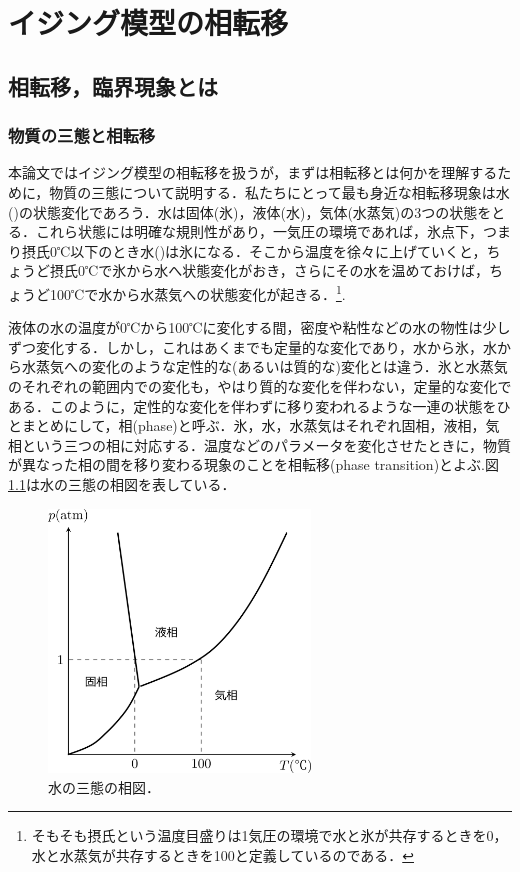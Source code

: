 \documentclass[a4paper,11pt]{jsreport}
\begin{document}
\chapter{イジング模型の相転移}
\section{相転移，臨界現象とは}
\subsection{物質の三態と相転移}
本論文ではイジング模型の相転移を扱うが，まずは相転移とは何かを理解するために，物質の三態について説明する．私たちにとって最も身近な相転移現象は水()の状態変化であろう．水は固体(氷)，液体(水)，気体(水蒸気)の3つの状態をとる．これら状態には明確な規則性があり，一気圧の環境であれば，氷点下，つまり摂氏0℃以下のとき水()は氷になる．そこから温度を徐々に上げていくと，ちょうど摂氏0℃で氷から水へ状態変化がおき，さらにその水を温めておけば，ちょうど100℃で水から水蒸気への状態変化が起きる．\footnote{そもそも摂氏という温度目盛りは1気圧の環境で水と氷が共存するときを0，水と水蒸気が共存するときを100と定義しているのである．}.\par
液体の水の温度が0℃から100℃に変化する間，密度や粘性などの水の物性は少しずつ変化する．しかし，これはあくまでも定量的な変化であり，水から氷，水から水蒸気への変化のような定性的な(あるいは質的な)変化とは違う．氷と水蒸気のそれぞれの範囲内での変化も，やはり質的な変化を伴わない，定量的な変化である．このように，定性的な変化を伴わずに移り変われるような一連の状態をひとまとめにして，相(phase)と呼ぶ．氷，水，水蒸気はそれぞれ固相，液相，気相という三つの相に対応する．温度などのパラメータを変化させたときに，物質が異なった相の間を移り変わる現象のことを相転移(phase transition)とよぶ.図\ref{水の相転移}は水の三態の相図を表している．\par
\begin{figure}[H]
   \begin{center}
       \includegraphics[height=7cm]{image/水の相転移.png}
       \caption{水の三態の相図．}
       \label{水の相転移}
   \end{center}
\end{figure}
\end{document}

